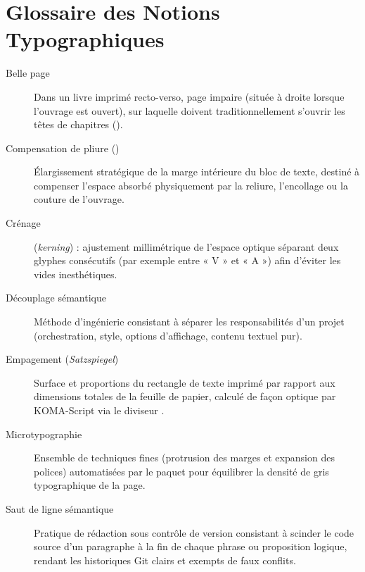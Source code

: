 \vspace{1.2cm}

\section*{Glossaire des Notions Typographiques}

\begin{description}
  \item[Belle page] Dans un livre imprimé recto-verso, page impaire (située à droite lorsque l'ouvrage est ouvert),
  sur laquelle doivent traditionnellement s'ouvrir les têtes de chapitres ().
  \item[Compensation de pliure ()] Élargissement stratégique de la marge intérieure du bloc de texte,
  destiné à compenser l'espace absorbé physiquement par la reliure, l'encollage ou la couture de l'ouvrage.
  \item[Crénage] (\textit{kerning}) : ajustement millimétrique de l'espace optique séparant deux glyphes consécutifs
  (par exemple entre « V » et « A ») afin d'éviter les vides inesthétiques.
  \item[Découplage sémantique] Méthode d'ingénierie consistant à séparer les responsabilités
  d'un projet (orchestration, style, options d'affichage, contenu textuel pur).
  \item[Empagement (\textit{Satzspiegel})] Surface et proportions du rectangle de texte imprimé par rapport aux dimensions
  totales de la feuille de papier, calculé de façon optique par KOMA-Script via le diviseur .
  \item[Microtypographie] Ensemble de techniques fines (protrusion des marges et expansion des polices)
  automatisées par le paquet  pour équilibrer la densité de gris typographique de la page.
  \item[Saut de ligne sémantique] Pratique de rédaction sous contrôle de version consistant
  à scinder le code source d'un paragraphe à la fin de chaque phrase ou proposition logique,
  rendant les historiques Git clairs et exempts de faux conflits.
\end{description}
